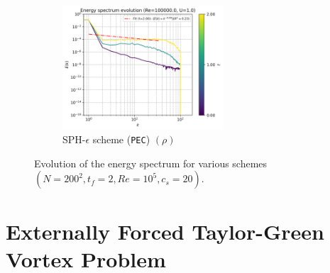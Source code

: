 \begin{figure}[htbp!]
\begin{subfigure}{7cm}
  \centering\includegraphics[width=6cm]{Code-Figures/long-tgv/c0_20_tait_hdx_2_pec_dtmul_1_mon2017_eps_0.5_no_n_o_files_50_nx_200_pst_10_re_100000_mon2017_tf_2/energy_spectrum_evolution_all.png}
  \caption{SPH-$\epsilon$ scheme (\texttt{PEC}) $(\rho)$}
  \end{subfigure}
  \caption{Evolution of the energy spectrum for various schemes $(N=200^2, t_f=2, Re=10^5, c_s=20)$.}
  \label{fig:ltgv-scheme-espec}
\end{figure}


\section{Externally Forced Taylor-Green Vortex Problem}


